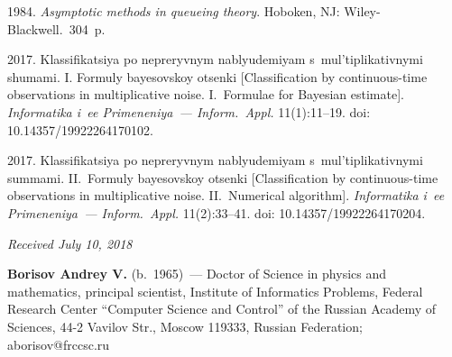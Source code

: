 \begin{multicols}{2}
{{\begin{thebibliography}{99}
 1984.
 \textit{Asymptotic methods in queueing theory}. 
 Hoboken, NJ: Wiley-Blackwell.~304~p.

   2017. 
  Klassifikatsiya po ne\-pre\-ryv\-nym nablyu\-de\-miyam s~mul'tiplikativnymi shumami. I. 
  Formuly bayesov\-skoy otsenki [Classification by continuous-time observations
in multiplicative noise. I.~Formulae for Bayesian 
estimate]. \textit{Informatika i~ee Primeneniya~--- Inform.~Appl.}
11(1):11--19. doi: 10.14357/19922264170102.

 2017. Klassifikatsiya po nepreryvnym nablyudemiyam 
s~mul'tiplikativnymi summami. II.~Formuly bayesovskoy otsenki 
[Classification by continuous-time observations
in multiplicative noise. II.~Numerical algorithm].
\textit{Informatika i~ee Primeneniya~--- Inform.~Appl.}
11(2):33--41. doi: 10.14357/19922264170204.

\end{thebibliography}

 }
 }

\end{multicols}

\vspace*{-6pt}

\hfill{\small\textit{Received July 10, 2018}}



\Contrl

\noindent
\textbf{Borisov Andrey V.} (b.\ 1965)~--- 
Doctor of Science in physics and mathematics, principal scientist, Institute of
Informatics Problems, Federal Research Center ``Computer Science and Control''
 of the Russian Academy of
Sciences, 44-2 Vavilov Str., Moscow 119333, Russian Federation; 
\mbox{aborisov@frccsc.ru}
\label{end\stat}

\renewcommand{\bibname}{\protect\rm Литература}       